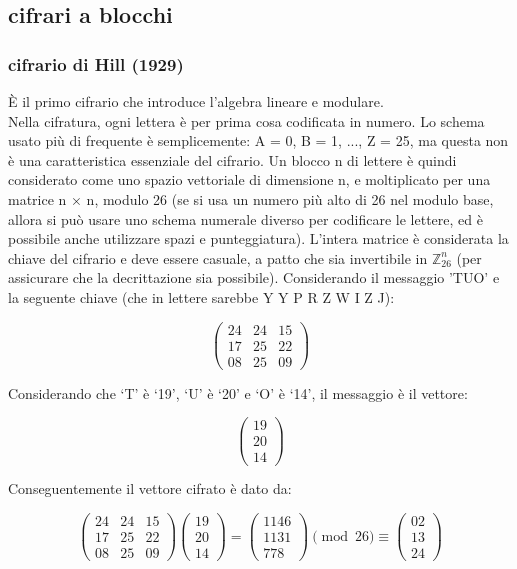 \documentclass[10pt,a4paper]{article}
\begin{document}
\subsection{cifrari a blocchi}
\subsubsection{cifrario di Hill (1929)}
È il primo cifrario che introduce l'algebra lineare e modulare.\\
Nella cifratura, ogni lettera è per prima cosa codificata in numero. Lo schema usato più di frequente è semplicemente: A = 0, B = 1, ..., Z = 25, ma questa non è una caratteristica essenziale del cifrario. Un blocco n di lettere è quindi considerato come uno spazio vettoriale di dimensione n, e moltiplicato per una matrice n $\times$ n, modulo 26 (se si usa un numero più alto di 26 nel modulo base, allora si può usare uno schema numerale diverso per codificare le lettere, ed è possibile anche utilizzare spazi e punteggiatura). L'intera matrice è considerata la chiave del cifrario e deve essere casuale, a patto che sia invertibile in $\mathbb{Z}_{26}^n$ (per assicurare che la decrittazione sia possibile). Considerando il messaggio 'TUO' e la seguente chiave (che in lettere sarebbe Y Y P R Z W I Z J):

    $$\begin{pmatrix} 24 & 24 & 15 \\ 17 & 25 & 22 \\ 08 & 25 & 09 \end{pmatrix} $$

Considerando che ‘T’ è ‘19’, ‘U’ è ‘20’ e ‘O’ è ‘14’, il messaggio è il vettore:

   $$ \begin{pmatrix} 19 \\ 20 \\ 14 \end{pmatrix}$$

Conseguentemente il vettore cifrato è dato da:

    $$\begin{pmatrix} 24 & 24 & 15 \\ 17 & 25 & 22 \\ 08 & 25 & 09 \end{pmatrix} \begin{pmatrix} 19 \\ 20 \\ 14 \end{pmatrix} = \begin{pmatrix} 1146 \\ 1131 \\ 778 \end{pmatrix} \pmod{26} \equiv \begin{pmatrix} 02 \\ 13 \\ 24 \end{pmatrix} $$
\end{document}
